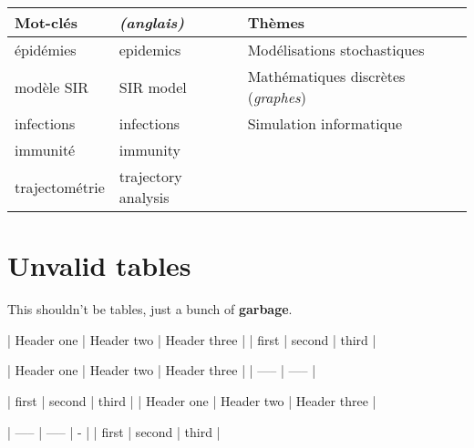 \documentclass{article}
\begin{document}
\begin{tabular}{ |l | l | l| }
 Mot-clés        &  \textit{(anglais)}          &  Thèmes                              \\
\hline

 épidémies       &  epidemics            &  Modélisations stochastiques         \\

 modèle SIR      &  SIR model            &  Mathématiques discrètes (\textit{graphes}) \\

 infections      &  infections           &  Simulation informatique             \\

 immunité        &  immunity             &                                      \\

 trajectométrie  &  trajectory analysis  &                                      \\

\end{tabular}

\part*{Unvalid tables}

This shouldn't be tables, just a bunch of \textbf{garbage}.


| Header one | Header two | Header three |
| first | second | third |


| Header one | Header two | Header three |
| ----- | ----- |


| first | second | third |
| Header one | Header two | Header three |

| ----- | ----- | - |
| first | second | third |
\end{document}
